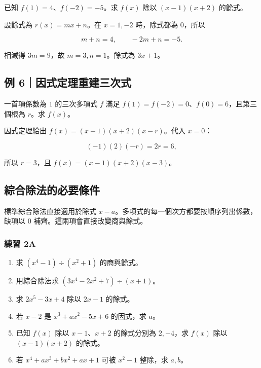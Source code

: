 \documentclass[11pt,a4paper]{article}
\providecommand{\tightlist}{%
  \setlength{\itemsep}{0pt}\setlength{\parskip}{0pt}}
\begin{document}
已知 \(f(1)=4\)、\(f(-2)=-5\)。求 \(f(x)\) 除以 \((x-1)(x+2)\) 的餘式。

設餘式為 \(r(x)=mx+n\)。在 \(x=1,-2\) 時，除式都為 \(0\)，所以

\[
m+n=4,\qquad -2m+n=-5.
\]

相減得 \(3m=9\)，故 \(m=3,n=1\)。餘式為 \(\boxed{3x+1}\)。

\subsection{例 6｜因式定理重建三次式}\label{ux4f8b-6ux56e0ux5f0fux5b9aux7406ux91cdux5efaux4e09ux6b21ux5f0f}

一首項係數為 \(1\) 的三次多項式 \(f\) 滿足 \(f(1)=f(-2)=0\)、\(f(0)=6\)，且第三個根為 \(r\)。求 \(f(x)\)。

因式定理給出 \(f(x)=(x-1)(x+2)(x-r)\)。代入 \(x=0\)：

\[
(-1)(2)(-r)=2r=6,
\]

所以 \(r=3\)，且 \(\boxed{f(x)=(x-1)(x+2)(x-3)}\)。

\subsection{綜合除法的必要條件}\label{ux7d9cux5408ux9664ux6cd5ux7684ux5fc5ux8981ux689dux4ef6}

標準綜合除法直接適用於除式 \(x-a\)。多項式的每一個次方都要按順序列出係數，缺項以 \(0\) 補齊。這兩項會直接改變商與餘式。

\subsubsection{練習 2A}\label{ux7df4ux7fd2-2a}

\begin{enumerate}
\def\labelenumi{\arabic{enumi}.}
\tightlist
\item
  求 \((x^4-1)\div(x^2+1)\) 的商與餘式。
\item
  用綜合除法求 \((3x^4-2x^2+7)\div(x+1)\)。
\item
  求 \(2x^5-3x+4\) 除以 \(2x-1\) 的餘式。
\item
  若 \(x-2\) 是 \(x^3+ax^2-5x+6\) 的因式，求 \(a\)。
\item
  已知 \(f(x)\) 除以 \(x-1\)、\(x+2\) 的餘式分別為 \(2,-4\)，求 \(f(x)\) 除以 \((x-1)(x+2)\) 的餘式。
\item
  若 \(x^4+ax^3+bx^2+ax+1\) 可被 \(x^2-1\) 整除，求 \(a,b\)。
\end{enumerate}
\end{document}
